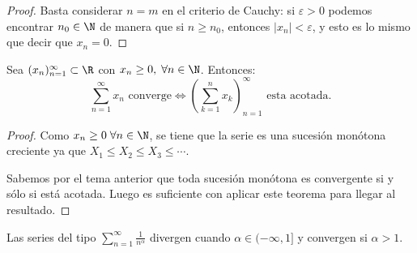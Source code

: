 \begin{proof}
	Basta considerar \(n = m \) en el criterio de Cauchy: si \( \varepsilon > 0 \) podemos encontrar \(n_0 \in \N\) de manera que si \(n \geq n_0\), entonces \(\left\vert x_n \right\vert < \varepsilon\), y esto es lo mismo que decir que \(x_n = 0\).
\end{proof}
\begin{proposition}
	Sea \((x_n)^{\infty}_{n=1} \subset \R \) con \(x_n \geq 0, \; \forall n \in \N \). Entonces:
	\[
		\sum_{n =1}^{\infty} x_n \text{ converge} \iff (\sum_{k =1}^{n } x_k )^{\infty}_{n=1} \text{ esta acotada}.
	\]
\end{proposition}
\begin{proof}
	Como \(x_n \geq 0 \; \forall n \in \N\), se tiene que la serie es una sucesión monótona creciente ya que \(X_1 \leq X_2 \leq X_3 \leq \cdots \).

	Sabemos por el tema anterior que toda sucesión monótona es convergente si y sólo si está acotada. Luego es suficiente con aplicar este teorema para llegar al resultado.
\end{proof}

\begin{proposition}
	\label{serieacot}
	Las series del tipo \(\sum_{n =1}^{\infty} \frac{1}{n^{\alpha} } \) divergen cuando \(\alpha \in (-\infty, 1] \) y convergen si \(\alpha > 1 \).
\end{proposition}

